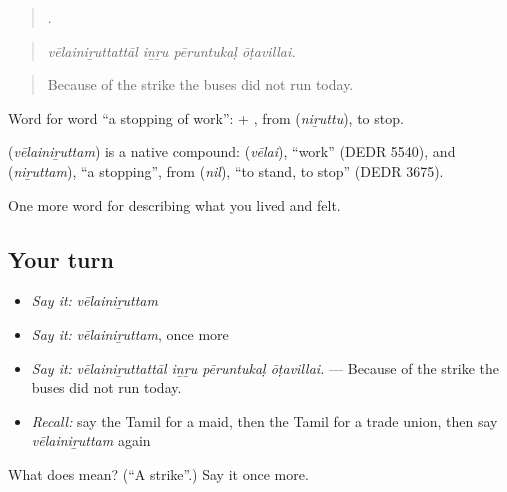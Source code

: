 \begin{quote}
   .
\end{quote}

\begin{quote}
\emph{vēlainiṟuttattāl iṉṟu pēruntukaḷ ōṭavillai.}
\end{quote}

\begin{quote}
Because of the strike the buses did not run today.
\end{quote}

Word for word \textquotedblleft{}a stopping of work\textquotedblright{}:  + , from  (\emph{niṟuttu}), to stop.

\begin{cousinweb}
\textbf{} (\emph{vēlainiṟuttam}) is a native compound:  (\emph{vēlai}), \textquotedblleft{}work\textquotedblright{} (DEDR 5540), and  (\emph{niṟuttam}), \textquotedblleft{}a stopping\textquotedblright{}, from  (\emph{nil}), \textquotedblleft{}to stand, to stop\textquotedblright{} (DEDR 3675).
\end{cousinweb}

\begin{grammarlens}[title={What you've built}]
One more word for describing what you lived and felt.
\end{grammarlens}

\subsection*{Your turn}
\begin{itemize}
\raggedright
  \item \emph{Say it:} \emph{vēlainiṟuttam}
  \item \emph{Say it:} \emph{vēlainiṟuttam}, once more
  \item \emph{Say it:} \emph{vēlainiṟuttattāl iṉṟu pēruntukaḷ ōṭavillai.} — Because of the strike the buses did not run today.
  \item \emph{Recall:} say the Tamil for a maid, then the Tamil for a trade union, then say \emph{vēlainiṟuttam} again
\end{itemize}

\begin{tcolorbox}[breakable,colback=teal!4,colframe=teal!35!black,title={Before you move on}]
What does  mean? (\textquotedblleft{}A strike\textquotedblright{}.) Say it once more.
\end{tcolorbox}
